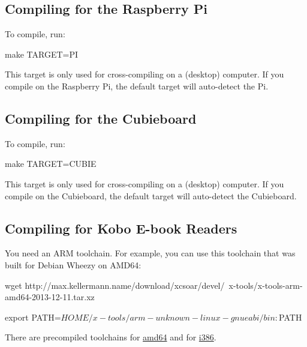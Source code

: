 \subsection{Compiling for the Raspberry Pi}

To compile, run:

\begin{verbatim*}
make TARGET=PI
\end{verbatim*}

This target is only used for cross-compiling on a (desktop) computer.
If you compile on the Raspberry Pi, the default target will
auto-detect the Pi.

\subsection{Compiling for the Cubieboard}

To compile, run:

\begin{verbatim*}
make TARGET=CUBIE
\end{verbatim*}

This target is only used for cross-compiling on a (desktop) computer.
If you compile on the Cubieboard, the default target will auto-detect
the Cubieboard.

\subsection{Compiling for Kobo E-book Readers}

You need an ARM toolchain.  For example, you can use this toolchain
that was built for Debian Wheezy on AMD64:

\begin{verbatim*}
wget http://max.kellermann.name/download/xcsoar/devel/\
x-tools/x-tools-arm-amd64-2013-12-11.tar.xz
\end{verbatim*}
\begin{verbatim*}
export PATH=$HOME/x-tools/arm-unknown-linux-gnueabi/bin:$PATH
\end{verbatim*}

There are precompiled toolchains for
\href{http://max.kellermann.name/download/xcsoar/devel/x-tools/x-tools-arm-amd64-2013-12-11.tar.xz}{amd64}
and for
\href{http://max.kellermann.name/download/xcsoar/devel/x-tools/x-tools-arm-i386-2013-12-11.tar.xz}{i386}.

